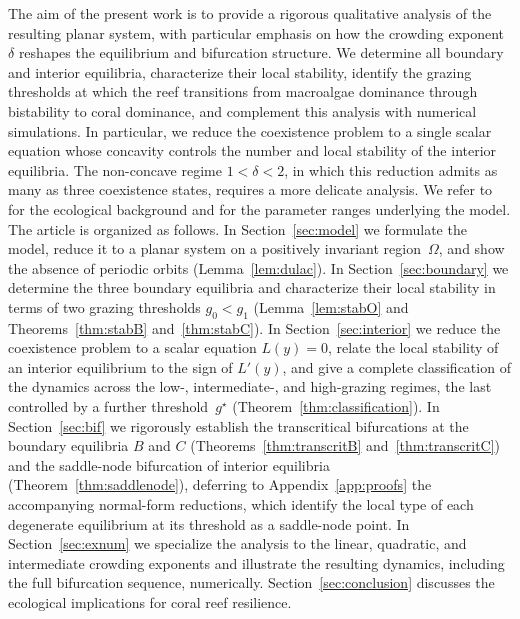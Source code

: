 \documentclass[reqno,11pt]{amsart}
\numberwithin{equation}{section}
\begin{document}
The aim of the present work is to provide a rigorous qualitative analysis of the resulting planar system, with particular emphasis on how the crowding exponent $\delta$ reshapes the equilibrium and bifurcation structure. We determine all boundary and interior equilibria, characterize their local stability, identify the grazing thresholds at which the reef transitions from macroalgae dominance through bistability to coral dominance, and complement this analysis with numerical simulations. 
In particular, we reduce the coexistence problem to a single scalar equation whose concavity controls the number and local stability of the interior equilibria. The non-concave regime $1<\delta<2$, in which this reduction admits as many as three coexistence states, requires a more delicate analysis. We refer to~\cite{Fun11,Mum07,TanLanWei24} for the ecological background and for the parameter ranges underlying the model.\\


The article is organized as follows. In Section~\ref{sec:model} we formulate the model, reduce it to a planar system on a positively invariant region~$\Omega$, and show the absence of periodic orbits (Lemma~\ref{lem:dulac}). In Section~\ref{sec:boundary} we determine the three boundary equilibria and characterize their local stability in terms of two grazing thresholds $g_0<g_1$ (Lemma~\ref{lem:stabO} and Theorems~\ref{thm:stabB} and~\ref{thm:stabC}). In Section~\ref{sec:interior} we reduce the coexistence problem to a scalar equation $L(y)=0$, relate the local stability of an interior equilibrium to the sign of $L'(y)$, and give a complete classification of the dynamics across the low-, intermediate-, and high-grazing regimes, the last controlled by a further threshold~$g^\star$ (Theorem~\ref{thm:classification}). In Section~\ref{sec:bif} we rigorously establish the transcritical bifurcations at the boundary equilibria $B$ and $C$ (Theorems~\ref{thm:transcritB} and~\ref{thm:transcritC}) and the saddle-node bifurcation of interior equilibria (Theorem~\ref{thm:saddlenode}), deferring to Appendix~\ref{app:proofs} the accompanying normal-form reductions, which identify the local type of each degenerate equilibrium at its threshold as a saddle-node point. In Section~\ref{sec:exnum} we specialize the analysis to the linear, quadratic, and intermediate crowding exponents and illustrate the resulting dynamics, including the full bifurcation sequence, numerically. Section~\ref{sec:conclusion} discusses the ecological implications for coral reef resilience.
\end{document}
